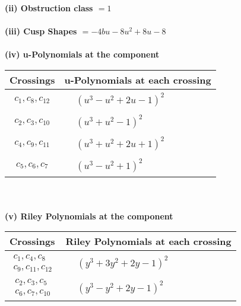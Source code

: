 \documentclass[1p]{elsarticle_modified}
\theoremstyle{definition}
\begin{document}
\flushleft \textbf{(ii) Obstruction class $= 1$}\\~\\
\flushleft \textbf{(iii) Cusp Shapes $= -4 b u-8 u^2+8 u-8$}\\~\\
\newpage\renewcommand{\arraystretch}{1}
\flushleft \textbf{(iv) u-Polynomials at the component}\newline \\
\begin{tabular}{m{50pt}|m{274pt}}
Crossings & \hspace{64pt}u-Polynomials at each crossing \\
\hline $$\begin{aligned}c_{1},c_{8},c_{12}\end{aligned}$$&$\begin{aligned}
&(u^3- u^2+2 u-1)^2
\end{aligned}$\\
\hline $$\begin{aligned}c_{2},c_{3},c_{10}\end{aligned}$$&$\begin{aligned}
&(u^3+u^2-1)^2
\end{aligned}$\\
\hline $$\begin{aligned}c_{4},c_{9},c_{11}\end{aligned}$$&$\begin{aligned}
&(u^3+u^2+2 u+1)^2
\end{aligned}$\\
\hline $$\begin{aligned}c_{5},c_{6},c_{7}\end{aligned}$$&$\begin{aligned}
&(u^3- u^2+1)^2
\end{aligned}$\\
\hline
\end{tabular}\\~\\
\newpage\renewcommand{\arraystretch}{1}
\flushleft \textbf{(v) Riley Polynomials at the component}\newline \\
\begin{tabular}{m{50pt}|m{274pt}}
Crossings & \hspace{64pt}Riley Polynomials at each crossing \\
\hline $$\begin{aligned}c_{1},c_{4},c_{8}\\c_{9},c_{11},c_{12}\end{aligned}$$&$\begin{aligned}
&(y^3+3 y^2+2 y-1)^2
\end{aligned}$\\
\hline $$\begin{aligned}c_{2},c_{3},c_{5}\\c_{6},c_{7},c_{10}\end{aligned}$$&$\begin{aligned}
&(y^3- y^2+2 y-1)^2
\end{aligned}$\\
\hline
\end{tabular}\\~\\
\end{document}
